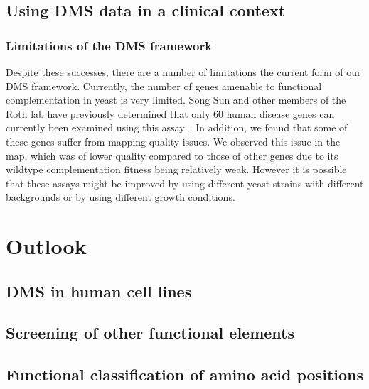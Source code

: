 \subsection{Using DMS data in a clinical context}
\subsubsection{Limitations of the DMS framework}
Despite these successes, there are a number of limitations the current form of our DMS framework. Currently, the number of genes amenable to functional complementation in yeast is very limited. Song Sun and other members of the Roth lab have previously determined that only 60 human disease genes can currently been examined using this assay~\cite{sun_extended_2016}. In addition, we found that some of these genes suffer from mapping quality issues. We observed this issue in the  map, which was of lower quality compared to those of other genes due to its wildtype complementation fitness being relatively weak. However it is possible that these assays might be improved by using different yeast strains with different backgrounds or by using different growth conditions.

\section{Outlook}

\subsection{DMS in human cell lines}

\subsection{Screening of other functional elements}

\subsection{Functional classification of amino acid positions}


